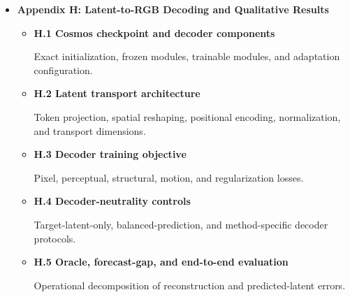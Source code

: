\begin{itemize}
\begin{itemize}
    Defines action, taxonomy, rollout, temporal-order, arrow-of-time,
    playback-pace, temporal-correspondence, and exposure-bias
    diagnostics under a common aggregation protocol.

    \item \textbf{E.4 Paired clustered inference and multiplicity}

    Defines the city--source-video estimand, hierarchical paired
    bootstrap, treatment of training seeds, mixed-effects sensitivity,
    and multiple-comparison control.

    \item \textbf{E.5 Metric sensitivity and complete numerical results}

    Reports horizon and masking curves, intervention-normalization
    sensitivity, cross-scale ranking robustness, leave-one-method and
    leave-one-family analyses, and the complete ViT-G and ViT-g
    numerical scorecards.

\end{itemize}


\item \textbf{Appendix H: Latent-to-RGB Decoding and Qualitative Results}
\begin{itemize}
    \item \textbf{H.1 Cosmos checkpoint and decoder components}
    
    Exact initialization, frozen modules, trainable modules, and
    adaptation configuration.

    \item \textbf{H.2 Latent transport architecture}
    
    Token projection, spatial reshaping, positional encoding,
    normalization, and transport dimensions.

    \item \textbf{H.3 Decoder training objective}
    
    Pixel, perceptual, structural, motion, and regularization losses.

    \item \textbf{H.4 Decoder-neutrality controls}
    
    Target-latent-only, balanced-prediction, and method-specific
    decoder protocols.

    \item \textbf{H.5 Oracle, forecast-gap, and end-to-end evaluation}
    
    Operational decomposition of reconstruction and predicted-latent
    errors.


\end{itemize}
\end{itemize}
